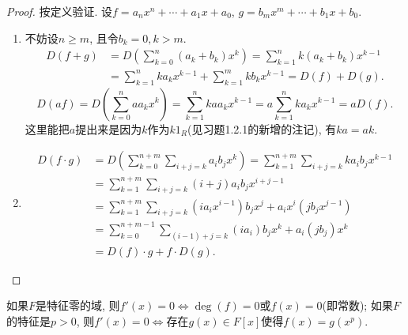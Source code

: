 \documentclass{../solutions-cn}
\begin{document}
\begin{proof}
    按定义验证. 设$f = a_nx^n + \cdots + a_1x + a_0$, $g = b_mx^m + \cdots + b_1x + b_0$.
    \begin{enumerate}[(1)]
        \item 不妨设$n \geqslant m$, 且令$b_k = 0, k > m$.
        \[
        \begin{aligned}
            D(f + g) &= D\left(\sum_{k = 0}^{n} (a_k + b_k)x^k\right) = \sum_{k = 1}^{n} k(a_k + b_k)x^{k - 1}\\ 
            &= \sum_{k = 1}^{n} ka_kx^{k - 1} + \sum_{k = 1}^{m} kb_kx^{k - 1} = D(f) + D(g).
        \end{aligned}
        \]
        \[
            D(af) = D\left(\sum_{k = 0}^{n} aa_kx^k\right) = \sum_{k = 1}^{n} kaa_kx^{k - 1} = a\sum_{k = 1}^{n} ka_kx^{k - 1} = aD(f).
        \]
        这里能把$a$提出来是因为$k$作为$k1_R$(见习题1.2.1的新增的注记), 有$ka = ak$.
        \item \[
            \begin{aligned}
                D(f \cdot g) &= D\left(\sum_{k = 0}^{n + m} \sum_{i + j = k} a_ib_jx^k\right) = \sum_{k = 1}^{n + m} \sum_{i + j = k} ka_ib_jx^{k - 1}\\
                &= \sum_{k = 1}^{n + m} \sum_{i + j = k} (i + j)a_ib_jx^{i + j - 1}\\
                &= \sum_{k = 1}^{n + m} \sum_{i + j = k} (ia_ix^{i - 1})b_jx^j + a_ix^i(jb_jx^{j - 1})\\
                &= \sum_{k = 0}^{n + m - 1} \sum_{(i - 1) + j = k} (ia_i)b_jx^{k} + a_i(jb_j)x^k\\
                &= D(f) \cdot g + f \cdot D(g).
            \end{aligned}
        \]
    \end{enumerate}
\end{proof}

\begin{exercise}[习题2.1.10]
    如果$F$是特征零的域, 则$f'(x) = 0 \Leftrightarrow \deg(f) = 0$或$f(x) = 0$(即常数); 如果$F$的特征是$p > 0$, 则$f'(x) = 0 \Leftrightarrow$存在$g(x) \in F[x]$使得$f(x) = g(x^p)$.
\end{exercise}
\end{document}
